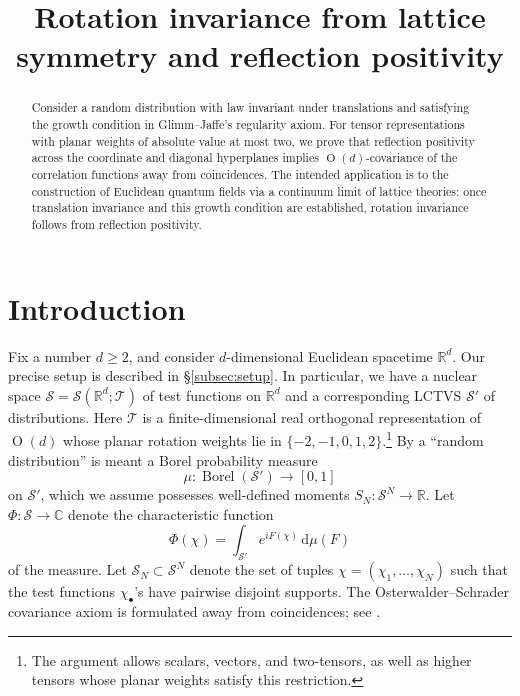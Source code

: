 \documentclass[11pt, letterpaper, reqno]{amsart}
\title[Rotation invariance from lattice symmetry]{Rotation invariance from lattice symmetry and reflection positivity}
\date{}
\theoremstyle{definition}
\theoremstyle{remark}
\newcommand{\bbC}{\mathbb{C}}
\newcommand{\bbR}{\mathbb{R}}
\newcommand{\calS}{\mathcal{S}}
\newcommand{\calT}{\mathcal{T}}
\newcommand{\dd}{\,\mathrm{d}}
\begin{document}
	
\begin{abstract}
    Consider a random distribution with law invariant under translations and satisfying the growth condition in Glimm--Jaffe's regularity axiom. For tensor representations with planar weights of absolute value at most two, we prove that reflection positivity across the coordinate and diagonal hyperplanes implies $\operatorname{O}(d)$-covariance of the correlation functions away from coincidences. The intended application is to the construction of Euclidean quantum fields via a continuum limit of lattice theories: once translation invariance and this growth condition are established, rotation invariance follows from reflection positivity. 
\end{abstract}	

\maketitle

\tableofcontents

\section{Introduction}

Fix a number $d\geq 2$, and consider $d$-dimensional Euclidean spacetime $\bbR^d$. 
Our precise setup is described in \S\ref{subsec:setup}. In particular, we have a nuclear space $\calS=\calS(\bbR^d;\calT)$ of test functions on $\bbR^d$ and a corresponding LCTVS $\calS'$ of distributions. Here $\calT$ is a finite-dimensional real orthogonal representation of $\operatorname{O}(d)$ whose planar rotation weights lie in $\{-2,-1,0,1,2\}$.\footnote{The argument allows scalars, vectors, and two-tensors, as well as higher tensors whose planar weights satisfy this restriction.} By a ``random distribution'' is meant a Borel probability measure 
\begin{equation} 
    \mu:\operatorname{Borel}(\calS')\to [0,1]
\end{equation} 
on $\calS'$, which we assume possesses well-defined moments $S_N: \calS^N\to \bbR$. Let $\Phi:\calS\to \bbC$ denote the characteristic function
\begin{equation}
    \Phi(\chi) = \int_{\calS'} e^{iF(\chi)} \dd \mu(F) 
\end{equation}
of the measure. 
Let $\calS_N \subset \calS^N$ denote the set of tuples $\chi=(\chi_1,\dots,\chi_N)$ such that the test functions $\chi_\bullet$'s have pairwise disjoint supports. The Osterwalder--Schrader covariance axiom is formulated away from coincidences; see \cite[\S2 and \S3, E1 and Remark~1]{OS}. 
\end{document}

